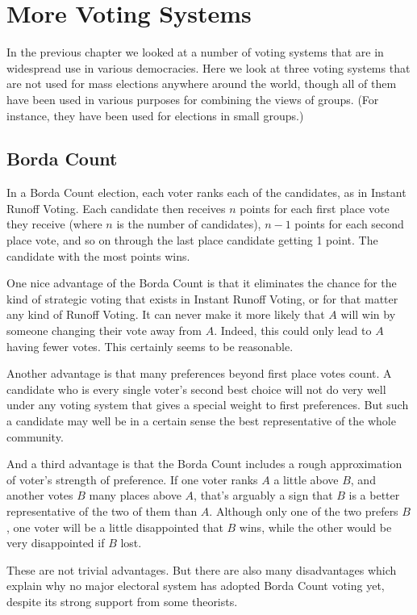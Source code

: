 \chapter{More Voting Systems}

In the previous chapter we looked at a number of voting systems that are in widespread use in various democracies. Here we look at three voting systems that are not used for mass elections anywhere around the world, though all of them have been used in various purposes for combining the views of groups. (For instance, they have been used for elections in small groups.)

\section{Borda Count}
In a Borda Count election, each voter ranks each of the candidates, as in Instant Runoff Voting. Each candidate then receives $n$ points for each first place vote they receive (where $n$ is the number of candidates), $n-1$ points for each second place vote, and so on through the last place candidate getting 1 point. The candidate with the most points wins.

One nice advantage of the Borda Count is that it eliminates the chance for the kind of strategic voting that exists in Instant Runoff Voting, or for that matter any kind of Runoff Voting. It can never make it more likely that $A$ will win by someone changing their vote away from $A$. Indeed, this could only lead to $A$ having fewer votes. This certainly seems to be reasonable.

Another advantage is that many preferences beyond first place votes count. A candidate who is every single voter's second best choice will not do very well under any voting system that gives a special weight to first preferences. But such a candidate may well be in a certain sense the best representative of the whole community.

And a third advantage is that the Borda Count includes a rough approximation of voter's strength of preference. If one voter ranks $A$ a little above $B$, and another votes $B$ many places above $A$, that's arguably a sign that $B$ is a better representative of the two of them than $A$. Although only one of the two prefers $B$, one voter will be a little disappointed that $B$ wins, while the other would be very disappointed if $B$ lost.

These are not trivial advantages. But there are also many disadvantages which explain why no major electoral system has adopted Borda Count voting yet, despite its strong support from some theorists.

